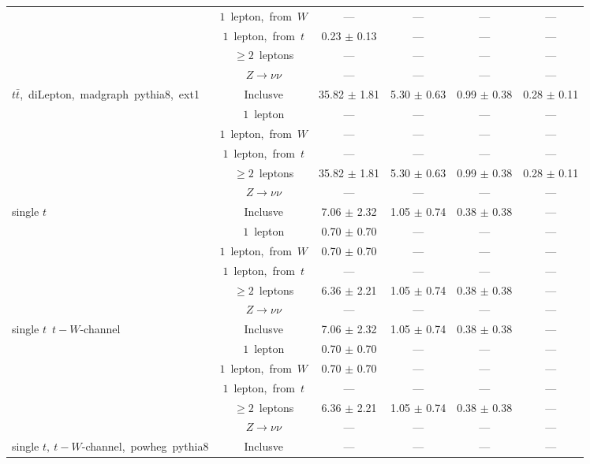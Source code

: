 \documentclass{article}
\begin{document}
\begin{longtable}{|l|c|c|c|c|c|}
 & $1$~lepton,~from~$W$  & ---  & ---  & ---  & --- \\* 
 & $1$~lepton,~from~$t$  & 0.23 $\pm$ 0.13  & ---  & ---  & --- \\* 
 & $\ge2$~leptons  & ---  & ---  & ---  & --- \\* 
 & $Z\rightarrow\nu\nu$  & ---  & ---  & ---  & --- \\* 
\hline 
\multirow{6}{*}{$t\bar{t}$,~diLepton,~madgraph~pythia8,~ext1} & Inclusve  & 35.82 $\pm$ 1.81  & 5.30 $\pm$ 0.63  & 0.99 $\pm$ 0.38  & 0.28 $\pm$ 0.11 \\* 
 & $1$~lepton  & ---  & ---  & ---  & --- \\* 
 & $1$~lepton,~from~$W$  & ---  & ---  & ---  & --- \\* 
 & $1$~lepton,~from~$t$  & ---  & ---  & ---  & --- \\* 
 & $\ge2$~leptons  & 35.82 $\pm$ 1.81  & 5.30 $\pm$ 0.63  & 0.99 $\pm$ 0.38  & 0.28 $\pm$ 0.11 \\* 
 & $Z\rightarrow\nu\nu$  & ---  & ---  & ---  & --- \\* 
\hline 
\multirow{6}{*}{single $t$} & Inclusve  & 7.06 $\pm$ 2.32  & 1.05 $\pm$ 0.74  & 0.38 $\pm$ 0.38  & --- \\* 
 & $1$~lepton  & 0.70 $\pm$ 0.70  & ---  & ---  & --- \\* 
 & $1$~lepton,~from~$W$  & 0.70 $\pm$ 0.70  & ---  & ---  & --- \\* 
 & $1$~lepton,~from~$t$  & ---  & ---  & ---  & --- \\* 
 & $\ge2$~leptons  & 6.36 $\pm$ 2.21  & 1.05 $\pm$ 0.74  & 0.38 $\pm$ 0.38  & --- \\* 
 & $Z\rightarrow\nu\nu$  & ---  & ---  & ---  & --- \\* 
\hline 
\multirow{6}{*}{single $t$~$t-W$-channel} & Inclusve  & 7.06 $\pm$ 2.32  & 1.05 $\pm$ 0.74  & 0.38 $\pm$ 0.38  & --- \\* 
 & $1$~lepton  & 0.70 $\pm$ 0.70  & ---  & ---  & --- \\* 
 & $1$~lepton,~from~$W$  & 0.70 $\pm$ 0.70  & ---  & ---  & --- \\* 
 & $1$~lepton,~from~$t$  & ---  & ---  & ---  & --- \\* 
 & $\ge2$~leptons  & 6.36 $\pm$ 2.21  & 1.05 $\pm$ 0.74  & 0.38 $\pm$ 0.38  & --- \\* 
 & $Z\rightarrow\nu\nu$  & ---  & ---  & ---  & --- \\* 
\hline 
\multirow{6}{*}{single $t,~t-W$-channel,~powheg~pythia8} & Inclusve  & ---  & ---  & ---  & --- \\* 

\end{longtable}
\end{document}
